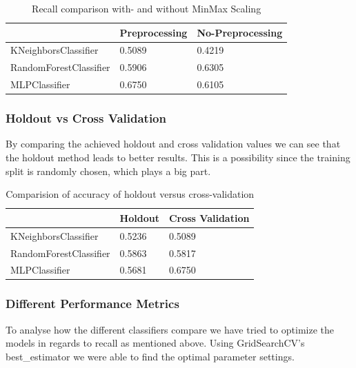 \documentclass{article}
\begin{document}
\begin{table}[h]
\begin{center}
\begin{tabular}{|l|l|l|}
\hline
                       & Preprocessing & No-Preprocessing \\ \hline
KNeighborsClassifier   & 0.5089        & 0.4219          \\ \hline
RandomForestClassifier & 0.5906        & 0.6305           \\ \hline
MLPClassifier          & 0.6750        & 0.6105           \\ \hline
\end{tabular}
\caption{Recall comparison with- and without MinMax Scaling}
\label{tab:onl_pre_no_pre}
\end{center}
\end{table}

\subsubsection{Holdout vs Cross Validation}
By comparing the achieved holdout and cross validation values we can see that the holdout method leads to better results. This is a possibility since the training split is randomly chosen, which plays a big part.

\begin{table}[h]
\begin{center}
\begin{tabular}{|l|l|l|}
\hline
                       & Holdout & Cross Validation \\ \hline
KNeighborsClassifier   & 0.5236  & 0.5089           \\ \hline
RandomForestClassifier & 0.5863  & 0.5817           \\ \hline
MLPClassifier          & 0.5681  & 0.6750           \\ \hline
\end{tabular}
\caption{Comparision of accuracy of holdout versus cross-validation}
\end{center}
\end{table}

%
\subsubsection{Different Performance Metrics}
To analyse how the different classifiers compare we have tried to optimize the models in regards to recall as mentioned above. Using GridSearchCV's best\_estimator we were able to find the optimal parameter settings.
\end{document}
